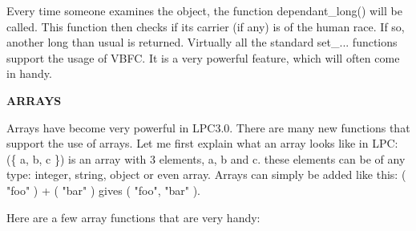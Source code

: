 Every time someone examines the object, the function dependant\_long() will be
called. This function then checks if its carrier (if any) is of the human
race. If so, another long than usual is returned. Virtually all the standard
set\_... functions support the usage of VBFC. It is a very powerful feature,
which will often come in handy.

{\bf ARRAYS}

Arrays have become very powerful in LPC3.0. There are many new functions that
support the use of arrays. Let me first explain what an array looks like in
LPC: (\{ a, b, c \}) is an array with 3 elements, a, b and c. these elements
can be of any type: integer, string, object or even array. Arrays can simply
be added like this: ({ "foo" }) + ({ "bar" }) gives ({ "foo", "bar" }).

Here are a few array functions that are very handy:

